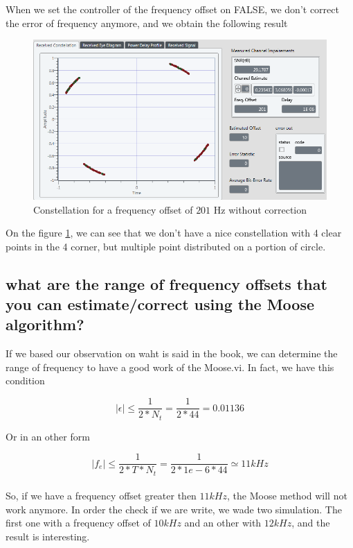 \documentclass[frenchb, oneside, headings=normal]{scrartcl}
\begin{document}
When we set the controller of the frequency offset on FALSE, we don't correct the error of frequency anymore, and we obtain the following result

\begin{figure}[!ht]
\centering
\includegraphics[scale=0.7]{img/test_offset_201hz_OFF.PNG}
\caption{Constellation for a frequency offset of $201$ Hz without correction}
\label{freq_correct_off}
\end{figure}

On the figure \ref{freq_correct_off}, we can see  that we don't have a nice constellation with 4 clear points in the 4 corner, but multiple point distributed on a portion of circle. 


\newpage

\subsection{what are the range of frequency offsets that you can estimate/correct using the Moose algorithm?}

If we based our observation on waht is said in the book, we can determine the range of frequency to have a good work of the Moose.vi. In fact, we have this condition

\begin{equation}
|\epsilon| \leq \frac{1}{2*N_t} = \frac{1}{2*44} = 0.01136
\label{cdt1}
\end{equation}

Or in an other form 

\begin{equation}
|f_e| \leq \frac{1}{2*T*N_t} = \frac{1}{2*1e-6*44} \simeq 11 kHz
\label{cdt2}
\end{equation}\\

So, if we have a frequency offset greater then $11 kHz$, the Moose method will not work anymore. In order the check if we are write, we wade two simulation. The first one with a frequency offset of $10 kHz$ and an other with $12 kHz$, and the result is interesting.\\
\end{document}
